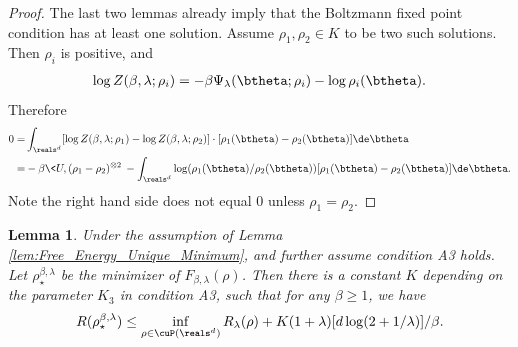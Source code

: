 \documentclass[11pt]{article}
\newtheorem{lemma}{Lemma}
\begin{document}
\begin{proof}
The last two lemmas already imply that the Boltzmann fixed point condition has at least one solution.
Assume $\rho_1, \rho_2 \in K$ to be two such solutions. Then $\rho_i$ is positive, and 
\[
\begin{aligned}
\log Z(\beta, \lambda; \rho_i) = - \beta \Psi_\lambda(\btheta; \rho_i) - \log \rho_i(\btheta).
\end{aligned}
\]
Therefore
\[
\begin{aligned}
0 = & \int_{\reals^d} [ \log Z(\beta, \lambda; \rho_1) - \log Z(\beta, \lambda; \rho_2)] \cdot [ \rho_1(\btheta) - \rho_2(\btheta) ]   \de \btheta  \\
=& - \beta \< U, (\rho_1 -  \rho_2)^{\otimes 2}\> - \int_{\reals^d} \log(\rho_1(\btheta) / \rho_2(\btheta)) [\rho_1(\btheta) - \rho_2(\btheta)] \de \btheta.
\end{aligned}
\]
Note the right hand side does not equal $0$ unless $\rho_1 = \rho_2$. 

\end{proof}



\begin{lemma}\label{lem:Bound_global_minimizer_free_energy}
Under the assumption of Lemma \ref{lem:Free_Energy_Unique_Minimum}, and further assume condition {\sf A3} holds. Let $\rho_\star^{\beta, \lambda}$ be the minimizer of $F_{\beta, \lambda}(\rho)$. Then there is a constant $K$ depending on the parameter $K_3$ in condition {\sf A3}, such that for any $\beta \ge 1$, we have
\begin{align}
R(\rho_\star^{\beta, \lambda}) \le \inf_{\rho \in \cuP(\reals^d)} R_\lambda(\rho) + K (1+ \lambda) [d \log (2 + 1/\lambda)] /\beta. 
\end{align} 

\end{lemma}
\end{document}
